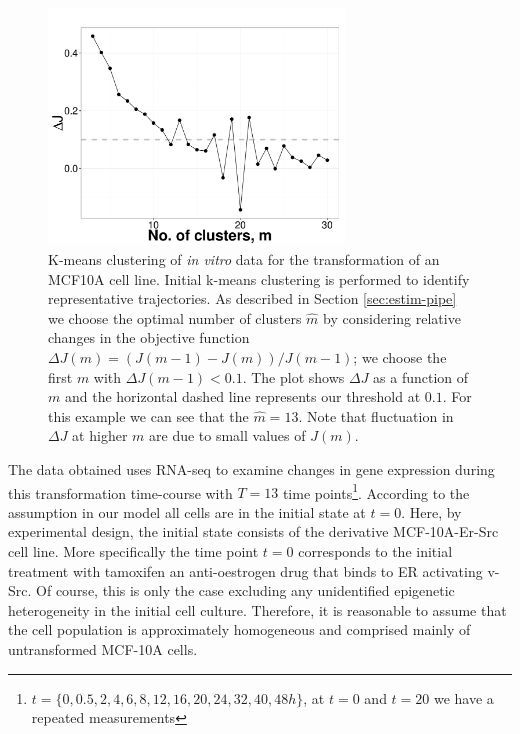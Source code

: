 \begin{figure}
  \centering
  \includegraphics[width=0.7\textwidth]{pics/kmeans-dat.pdf}
  \caption{K-means clustering of {\it in vitro} data for the transformation of an MCF10A cell line. Initial k-means clustering is performed to identify representative trajectories. As described in Section \ref{sec:estim-pipe} we choose the optimal number of clusters $\hat{m}$ by considering relative changes in the objective function $\Delta J (m) = (J(m-1) - J(m))/J(m-1)$; we choose the first $m$ with $\Delta J(m-1) < 0.1$. The plot shows $\Delta J$ as a function of $m$ and the horizontal dashed line represents our threshold at $0.1$. For this example we can see that the $\hat{m} = 13$. Note that fluctuation in $\Delta J$ at higher $m$ are due to small values of $J(m)$. }
  \label{fig:kmeans-dat}
\end{figure}

The data obtained uses RNA-seq to examine changes in gene expression during this transformation time-course with $T=13$ time points\footnote{$t=\lbrace 0, 0.5,  2,  4,  6,  8, 12, 16, 20, 24, 32, 40, 48h \rbrace$, at $t=0$ and $t=20$ we have a repeated measurements}. According to the assumption in our model all cells are in the initial state at $t=0$. Here, by experimental design, the initial state consists of the derivative MCF-10A-Er-Src cell line. More specifically the time point $t=0$ corresponds to the initial treatment with tamoxifen an anti-oestrogen drug that binds to ER activating v-Src. Of course, this is only the case excluding any unidentified epigenetic heterogeneity in the initial cell culture. Therefore, it is reasonable to assume that the cell population is approximately homogeneous and comprised mainly of untransformed MCF-10A cells.

